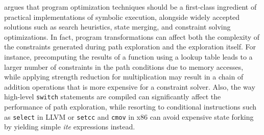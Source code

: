 

\cite{Cadar-FSE15} argues that program optimization techniques should be a first-class ingredient of practical implementations of symbolic execution, alongside widely accepted solutions such as search heuristics, state merging, and constraint solving optimizations. In fact, program transformations can affect both the complexity of the constraints generated during path exploration and the exploration itself. For instance, precomputing the results of a function using a lookup table leads to a larger number of constraints in the path conditions due to memory accesses, while applying strength reduction for multiplication may result in a chain of addition operations that is more expensive for a constraint solver. Also, the way high-level {\tt switch} statements are compiled can significantly affect the performance of path exploration, while resorting to conditional instructions such as {\tt select} in LLVM or {\tt setcc} and {\tt cmov} in x86 can avoid expensive state forking by yielding simple {\em ite} expressions instead.

